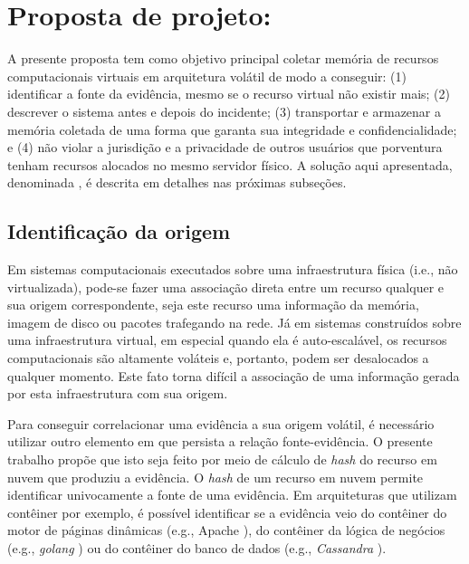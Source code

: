 \chapter{Proposta de projeto: \fancyname}
\label{chp:proposta}

A presente proposta tem como objetivo principal coletar memória de recursos computacionais virtuais em arquitetura volátil de modo a conseguir: 
(1) identificar a fonte da evidência, mesmo se o recurso virtual não existir mais; 
(2) descrever o sistema antes e depois do incidente;
(3) transportar e armazenar a memória coletada de uma forma que garanta sua integridade e confidencialidade; e
(4) não violar a jurisdição e a privacidade de outros usuários que porventura tenham recursos alocados no mesmo servidor físico.
%
A solução aqui apresentada, denominada \fancyname, é descrita em detalhes nas próximas subseções.

\section{Identificação da origem}
\label{sec:proposal-desc-origin}

Em sistemas computacionais executados sobre uma infraestrutura física (i.e., não virtualizada), pode-se fazer uma associação direta entre um recurso qualquer e sua origem correspondente, seja este recurso uma informação da memória, imagem de disco ou pacotes trafegando na rede.
%
Já em sistemas construídos sobre uma infraestrutura virtual, em especial quando ela é auto-escalável, os recursos computacionais são altamente voláteis e, portanto, podem ser desalocados a qualquer momento.
%
Este fato torna difícil a associação de uma informação gerada por esta infraestrutura com sua origem.


Para conseguir correlacionar uma evidência a sua origem volátil, é necessário utilizar outro elemento em que persista a relação fonte-evidência.
%
O presente trabalho propõe que isto seja feito por meio de cálculo de \textit{hash} do recurso em nuvem que produziu a evidência. %
%
%
O \textit{hash} de um recurso em nuvem permite identificar univocamente a fonte de uma evidência. Em arquiteturas que utilizam contêiner por exemplo, é possível identificar se a evidência veio do contêiner do motor de páginas dinâmicas (e.g., Apache%
), do contêiner da lógica de negócios (e.g., \textit{golang}%
) ou do contêiner do banco de dados (e.g., \textit{Cassandra}%
). %

